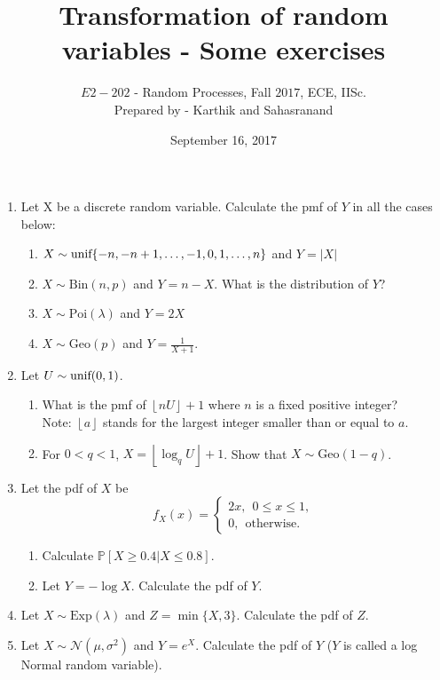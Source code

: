 \documentclass[11pt]{article}
\title {\sc Transformation of random variables - Some exercises}
\author{$E2-202$ - Random Processes, Fall $2017$, ECE, IISc.\\Prepared by - Karthik and Sahasranand}
\date{September 16, 2017}
\begin{document}
\maketitle 

\begin{enumerate}
\item Let X be a discrete random variable. Calculate the pmf of $Y$ in all the cases below:
\begin{enumerate}
\item $X \sim \text{\text{unif}}\{-n,-n+1,\ldots,-1,0,1,\ldots,n\}$ and $Y = |X|$
\item $X \sim \text{Bin}(n,p)$ and $Y=n-X$. What is the distribution of $Y$?
\item $X \sim \text{Poi}(\lambda)$ and $Y=2X$
\item $X \sim \text{Geo}(p)$ and $Y = \frac{1}{X+1}$.
\end{enumerate}

\item Let $U \sim \text{\text{unif}}(0,1)$. 
\begin{enumerate}
\item What is the pmf of $\left \lfloor{nU}\right \rfloor + 1$ where $n$ is a fixed positive integer? \\Note: $\left \lfloor{a}\right \rfloor$ stands for the largest integer smaller than or equal to $ a$.
\item For $0 < q < 1$, $X = \left \lfloor{\log_qU}\right \rfloor + 1$. Show that $X \sim \text{Geo}(1-q)$.
\end{enumerate}

\item Let the pdf of $X$ be 
\[
f_X(x) = \begin{cases}
2x, ~~0 \le x \le 1,\\
0, ~~\text{otherwise.}
\end{cases}
\]
\begin{enumerate}
\item Calculate $\mathbb{P}[X \ge 0.4 | X \le 0.8]$.
\item Let $Y = -\log X$. Calculate the pdf of $Y$.
\end{enumerate}

\item Let $X \sim \text{Exp}(\lambda)$ and $Z = \min\{X,3\}$. Calculate the pdf of $Z$.

\item Let $X \sim \mathcal{N}(\mu,\sigma^2)$ and $Y = e^X$. Calculate the pdf of $Y$ ($Y$ is called a log Normal random variable).


\end{enumerate}
\end{document}

